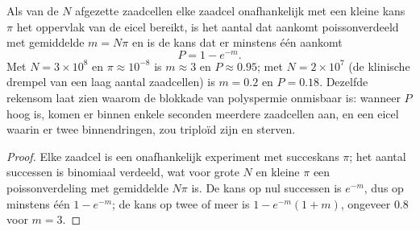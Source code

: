 \begin{theorem}\label{thm:b2:mammal-reproduction:poisson}
Als van de $N$ afgezette zaadcellen elke zaadcel onafhankelijk met een
kleine kans $\pi$ het oppervlak van de eicel bereikt, is het aantal dat
aankomt poissonverdeeld met gemiddelde $m = N\pi$ en is de kans dat er
minstens één aankomt
\[
P = 1 - e^{-m}.
\]
Met $N = 3\times 10^{8}$ en $\pi \approx 10^{-8}$ is $m \approx 3$
en $P \approx 0.95$; met $N = 2\times 10^{7}$ (de klinische drempel van
een laag aantal zaadcellen) is $m = 0.2$ en $P = 0.18$. Dezelfde
rekensom laat zien waarom de blokkade van polyspermie onmisbaar is:
wanneer
$P$ hoog is, komen er binnen enkele seconden meerdere zaadcellen aan, en
een eicel waarin er twee binnendringen, zou triploïd zijn en sterven.
\end{theorem}
\begin{proof}
Elke zaadcel is een onafhankelijk experiment met succeskans $\pi$;
het aantal successen is binomiaal verdeeld, wat voor grote $N$ en kleine
$\pi$ een poissonverdeling met gemiddelde $N\pi$ is. De kans op nul
successen is $e^{-m}$, dus op minstens één $1 - e^{-m}$; de
kans op twee of meer is $1 - e^{-m}(1 + m)$, ongeveer $0.8$ voor
$m = 3$.
\end{proof}

